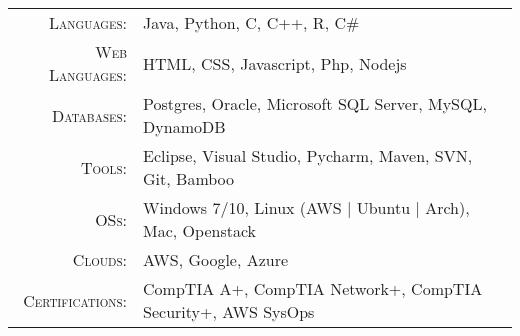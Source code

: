 %
%
%

\renewcommand{\arraystretch}{1.1}

	\begin{tabular}{>{}r>{}p{13cm}}
		\textsc{Languages:}			&   Java, Python, C, C++, R, C\#\\
		\textsc{Web Languages:}     &   HTML, CSS,  Javascript, Php, Nodejs\\
		\textsc{Databases:}			&   Postgres, Oracle, Microsoft SQL Server, MySQL, DynamoDB \\
		\textsc{Tools:}				&   Eclipse, Visual Studio, Pycharm, Maven, SVN, Git, Bamboo\\
		\textsc{OSs:}				&   Windows 7/10,  Linux (AWS | Ubuntu | Arch), Mac, Openstack\\
		\textsc{Clouds:}			&   AWS, Google, Azure\\
		\textsc{Certifications:}	&   CompTIA A+, CompTIA Network+, CompTIA Security+, AWS SysOps
	
		
	\end{tabular} 